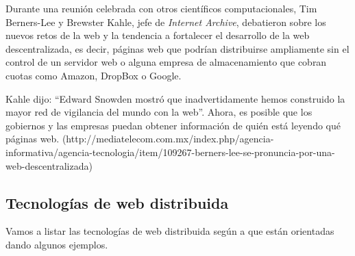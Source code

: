 \documentclass[12pt]{article} %
\begin{document}
Durante una reunión celebrada con otros científicos computacionales, Tim Berners-Lee y Brewster Kahle, jefe de \textit{Internet Archive}, debatieron sobre los nuevos retos de la web y la tendencia a fortalecer el desarrollo de la web descentralizada, es decir, páginas web que podrían distribuirse ampliamente sin el control de un servidor web o alguna empresa de almacenamiento que cobran cuotas como Amazon, DropBox o Google.

Kahle dijo: ``Edward Snowden mostró que inadvertidamente hemos construido la mayor red de vigilancia del mundo con la web''. Ahora, es posible que los gobiernos y las empresas puedan obtener información de quién está leyendo qué páginas web.
(http://mediatelecom.com.mx/index.php/agencia-informativa/agencia-tecnologia/item/109267-berners-lee-se-pronuncia-por-una-web-descentralizada)



\subsection{Tecnologías de web distribuida} %
\label{sub:tecnologías_de_web_distribuida}

Vamos a listar las tecnologías de web distribuida según a que están orientadas dando algunos ejemplos.
\end{document}
